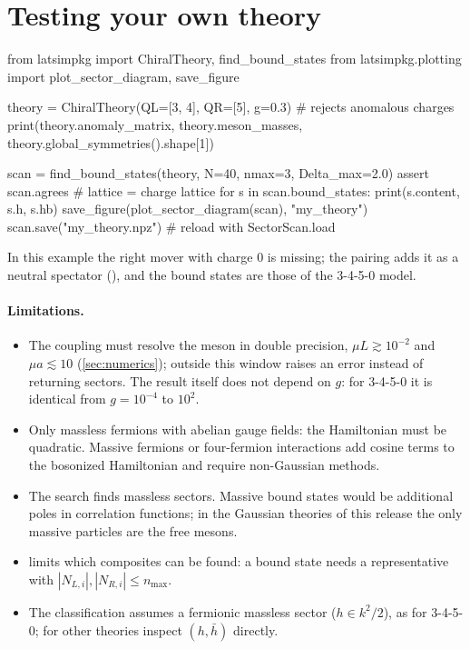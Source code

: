 \section{Testing your own theory}
\begin{python}
from latsimpkg import ChiralTheory, find_bound_states
from latsimpkg.plotting import plot_sector_diagram, save_figure

theory = ChiralTheory(QL=[3, 4], QR=[5], g=0.3)   # rejects anomalous charges
print(theory.anomaly_matrix, theory.meson_masses, theory.global_symmetries().shape[1])

scan = find_bound_states(theory, N=40, nmax=3, Delta_max=2.0)
assert scan.agrees                                 # lattice = charge lattice
for s in scan.bound_states:
    print(s.content, s.h, s.hb)
save_figure(plot_sector_diagram(scan), "my_theory")
scan.save("my_theory.npz")                         # reload with SectorScan.load
\end{python}
In this example the right mover with charge $0$ is missing; the pairing adds it as a neutral spectator
(), and the bound states are those of the 3-4-5-0 model.

\paragraph{Limitations.}
\begin{itemize}
  \item The coupling must resolve the meson in double precision, $\mu L\gtrsim10^{-2}$ and $\mu a\lesssim10$
    (\cref{sec:numerics}); outside this window  raises an error instead of returning sectors.
    The result itself does not depend on $g$: for 3-4-5-0 it is identical from $g = 10^{-4}$ to $10^2$.
  \item Only massless fermions with abelian gauge fields: the Hamiltonian must be quadratic. Massive fermions or
    four-fermion interactions add cosine terms to the bosonized Hamiltonian and require non-Gaussian methods.
  \item The search finds massless sectors. Massive bound states would be additional poles in correlation functions;
    in the Gaussian theories of this release the only massive particles are the free mesons.
  \item {} limits which composites can be found: a bound state needs a representative with
    $|N_{L,i}|,|N_{R,i}|\leq n_{\max}$.
  \item The classification assumes a fermionic massless sector ($h\in k^2/2$), as for 3-4-5-0; for other
    theories inspect $(h,\bar h)$ directly.
\end{itemize}
